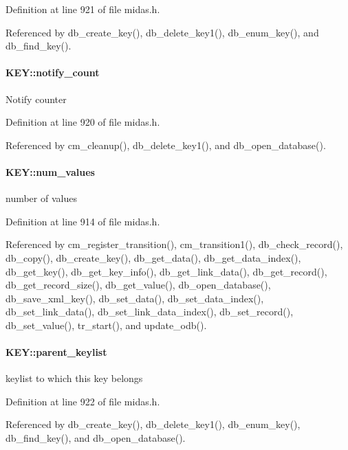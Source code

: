 Definition at line 921 of file midas.h.

Referenced by db\_\-create\_\-key(), db\_\-delete\_\-key1(), db\_\-enum\_\-key(), and db\_\-find\_\-key().
\paragraph[{notify\_\-count}]{ {\bf KEY::notify\_\-count}}\hfill\label{structKEY_a4c4c4ab142ebbe60bdb1c149a8ac2047}
Notify counter 

Definition at line 920 of file midas.h.

Referenced by cm\_\-cleanup(), db\_\-delete\_\-key1(), and db\_\-open\_\-database().
\paragraph[{num\_\-values}]{ {\bf KEY::num\_\-values}}\hfill\label{structKEY_a2604fa0fc38ce19b011785f806185a02}
number of values 

Definition at line 914 of file midas.h.

Referenced by cm\_\-register\_\-transition(), cm\_\-transition1(), db\_\-check\_\-record(), db\_\-copy(), db\_\-create\_\-key(), db\_\-get\_\-data(), db\_\-get\_\-data\_\-index(), db\_\-get\_\-key(), db\_\-get\_\-key\_\-info(), db\_\-get\_\-link\_\-data(), db\_\-get\_\-record(), db\_\-get\_\-record\_\-size(), db\_\-get\_\-value(), db\_\-open\_\-database(), db\_\-save\_\-xml\_\-key(), db\_\-set\_\-data(), db\_\-set\_\-data\_\-index(), db\_\-set\_\-link\_\-data(), db\_\-set\_\-link\_\-data\_\-index(), db\_\-set\_\-record(), db\_\-set\_\-value(), tr\_\-start(), and update\_\-odb().
\paragraph[{parent\_\-keylist}]{ {\bf KEY::parent\_\-keylist}}\hfill\label{structKEY_a7537bff06e9a41b4b211ccf665911c8e}
keylist to which this key belongs 

Definition at line 922 of file midas.h.

Referenced by db\_\-create\_\-key(), db\_\-delete\_\-key1(), db\_\-enum\_\-key(), db\_\-find\_\-key(), and db\_\-open\_\-database().
